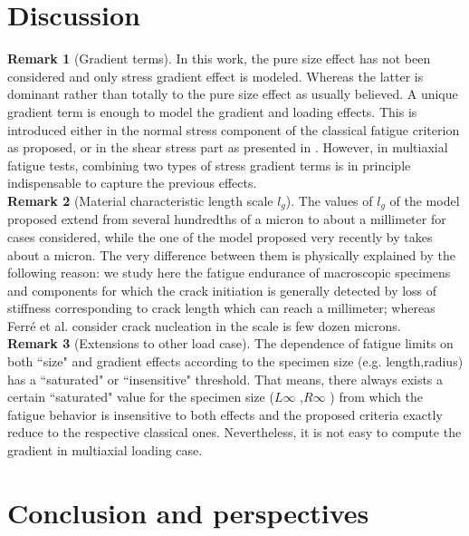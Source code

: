 \section{Discussion}
\noindent\textbf{Remark 1} (Gradient terms). In this work, the pure size effect has not been considered and only stress gradient effect is modeled. Whereas the latter is dominant rather than totally to the pure size effect as usually believed. 
A unique gradient term is enough to model the gradient and loading effects. This is introduced either in the normal stress component of the classical fatigue criterion as \cite{Papadopoulos1996513} proposed, or in the shear stress part as presented in \cite{Massonnet1956}. However, in multiaxial fatigue tests, combining two types of stress gradient terms is in principle indispensable to capture the previous effects.
\vspace{6pt} \\
\textbf{Remark 2} (Material characteristic length scale $l_g$). The values of $l_g$ of the model proposed extend from
several hundredths of a micron to about a millimeter for cases considered, while the one of the model
proposed very recently by  \cite{Ferre201356} takes about a micron. The very difference between them
is physically explained by the following reason: we study here the fatigue endurance of macroscopic
specimens and components for which the crack initiation is generally detected by loss of stiffness corresponding to crack length which can reach a millimeter; whereas Ferr{\'e} et al. consider crack nucleation in
the scale is few dozen microns.
\vspace{6pt} \\
\textbf{Remark 3} (Extensions to other load case). The dependence of fatigue limits on both ``size" and gradient effects according to the specimen size (e.g. length,radius) has a ``saturated" or ``insensitive" threshold. That
means, there always exists a certain ``saturated" value for the specimen size ($L\infty$ ,$R\infty$ ) from which the
fatigue behavior is insensitive to both effects and the proposed criteria exactly reduce to the respective
classical ones. Nevertheless, it is not easy to compute the gradient in multiaxial loading case.

\section{Conclusion and perspectives}

